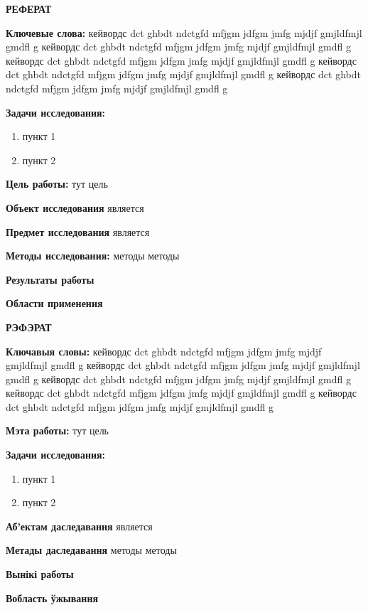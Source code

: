 \newpage

\begin{center}
	\textbf{\large РЕФЕРАТ}
\end{center}


\textbf{Ключевые слова:} кейвордс dct ghbdt ndctgfd mfjgm jdfgm jmfg mjdjf gmjldfmjl gmdfl g
кейвордс dct ghbdt ndctgfd mfjgm jdfgm jmfg mjdjf gmjldfmjl gmdfl g
кейвордс dct ghbdt ndctgfd mfjgm jdfgm jmfg mjdjf gmjldfmjl gmdfl g
кейвордс dct ghbdt ndctgfd mfjgm jdfgm jmfg mjdjf gmjldfmjl gmdfl g
кейвордс dct ghbdt ndctgfd mfjgm jdfgm jmfg mjdjf gmjldfmjl gmdfl g


\textbf{Задачи исследования:}
\begin{enumerate}
	\item пункт 1
	\item пункт 2
\end{enumerate}


\textbf{Цель работы:} тут цель


\textbf{Объект исследования} является


\textbf{Предмет исследования} является


\textbf{Методы исследования:} методы методы


\textbf{Результаты работы}


\textbf{Области применения}


\newpage
\begin{center}
	\textbf{\large РЭФЭРАТ}
\end{center}

\textbf{Ключавыя словы:} кейвордс dct ghbdt ndctgfd mfjgm jdfgm jmfg mjdjf gmjldfmjl gmdfl g
кейвордс dct ghbdt ndctgfd mfjgm jdfgm jmfg mjdjf gmjldfmjl gmdfl g
кейвордс dct ghbdt ndctgfd mfjgm jdfgm jmfg mjdjf gmjldfmjl gmdfl g
кейвордс dct ghbdt ndctgfd mfjgm jdfgm jmfg mjdjf gmjldfmjl gmdfl g
кейвордс dct ghbdt ndctgfd mfjgm jdfgm jmfg mjdjf gmjldfmjl gmdfl g

\textbf{Мэта работы:} тут цель

\textbf{Задачи исследования:}
\begin{enumerate}
	\item пункт 1
	\item пункт 2
\end{enumerate}

\textbf{Аб’ектам даследавання} является


\textbf{Метады даследавання} методы методы

\textbf{Вынікі работы}

\textbf{Вобласть ўжывання}


